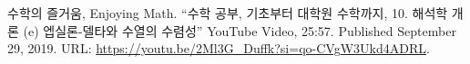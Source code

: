 \documentclass[11pt,openany]{article}
\begin{document}
\vfill

\begin{thebibliography}{9}
	수학의 즐거움, Enjoying Math. ``수학 공부, 기초부터 대학원 수학까지, 10. 해석학 개론 (e) 엡실론-델타와 수열의 수렴성'' YouTube Video, 25:57. Published 
	September 29, 2019. URL: \url{https://youtu.be/2Ml3G_Duffk?si=qo-CVgW3Ukd4ADRL}.
\end{thebibliography}
\end{document}
